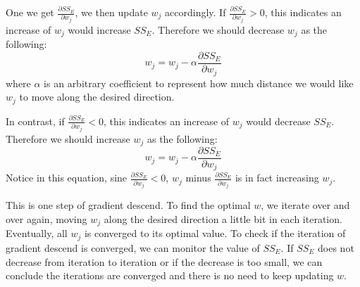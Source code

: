 \documentclass[
	letterpaper
]{article}
\begin{document}
One we get $\frac{\partial SS_E}{\partial w_j}$, we then update $w_j$ accordingly.
If $\frac{\partial SS_E}{\partial w_j} > 0$, this indicates an increase of $w_j$ would increase $SS_E$.
Therefore we should decrease $w_j$ as the following:
\begin{equation}
w_j = w_j - \alpha \frac{\partial SS_E}{\partial w_j} 
\end{equation}
where $\alpha$ is an arbitrary coefficient to represent how much distance we would like $w_j$ to move along the desired direction.
 
In contrast, if $\frac{\partial SS_E}{\partial w_j} < 0$, this indicates an increase of $w_j$ would decrease $SS_E$.
Therefore we should increase $w_j$ as the following:
\begin{equation}
w_j = w_j - \alpha \frac{\partial SS_E}{\partial w_j} 
\end{equation}
Notice in this equation, sine $\frac{\partial SS_E}{\partial w_j} < 0$, $w_j$ minus $\frac{\partial SS_E}{\partial w_j}$ is in fact increasing $w_j$.

This is one step of gradient descend. 
To find the optimal $w$, we iterate over and over again, moving $w_j$ along the desired direction a little bit in each iteration.
Eventually, all $w_j$ is converged to its optimal value.
To check if the iteration of gradient descend is converged, we can monitor the value of $SS_E$.
If $SS_E$ does not decrease from iteration to iteration or if the decrease is too small, we can conclude the iterations are converged and there is no need to keep updating $w$.
\end{document}
